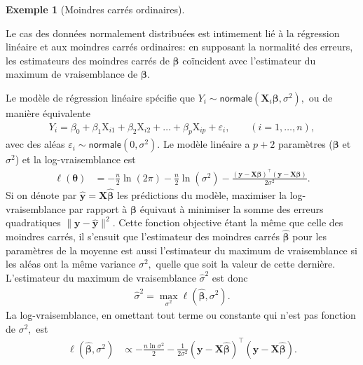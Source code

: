 \documentclass[
  11pt,
  letterpaper,
]{scrbook}
\theoremstyle{plain}
\theoremstyle{plain}
\theoremstyle{definition}
\newtheorem{example}{Exemple}[chapter]
\theoremstyle{definition}
\theoremstyle{remark}
\begin{document}
\begin{example}[Moindres carrés
ordinaires]\protect\hypertarget{exm-mco-mle}{}\label{exm-mco-mle}

Le cas des données normalement distribuées est intimement lié à la
régression linéaire et aux moindres carrés ordinaires: en supposant la
normalité des erreurs, les estimateurs des moindres carrés de
\(\boldsymbol{\beta}\) coïncident avec l'estimateur du maximum de
vraisemblance de \(\boldsymbol{\beta}.\)

Le modèle de régression linéaire spécifie que
\(Y_i \sim \mathsf{normale}(\mathbf{X}_i\boldsymbol{\beta}, \sigma^2),\)
ou de manière équivalente \begin{align*}
Y_i=\beta_0+\beta_1 \mathrm{X}_{i1}+\beta_2 \mathrm{X}_{i2}+\ldots +\beta_p \mathrm{X}_{ip} + \varepsilon_i, \qquad  (i=1, \ldots, n),
\end{align*} avec des aléas
\(\varepsilon_i \sim \mathsf{normale}(0, \sigma^2).\) Le modèle linéaire
a \(p+2\) paramètres (\(\boldsymbol{\beta}\) et \(\sigma^2\)) et la
log-vraisemblance est \begin{align*}
\ell(\boldsymbol{\theta})&=-\frac{n}{2} \ln(2\pi)-\frac{n}{2} \ln (\sigma^2) -\frac{(\boldsymbol{y}-\mathbf{X}\boldsymbol{\beta})^\top(\boldsymbol{y}-\mathbf{X}\boldsymbol{\beta})}{2\sigma^2}.
\end{align*} Si on dénote par
\(\widehat{\boldsymbol{y}}=\mathbf{X}\widehat{\boldsymbol{\beta}}\) les
prédictions du modèle, maximiser la log-vraisemblance par rapport à
\(\boldsymbol{\beta}\) équivaut à minimiser la somme des erreurs
quadratiques \(\|\boldsymbol{y} - \widehat{\boldsymbol{y}}\|^2.\) Cette
fonction objective étant la même que celle des moindres carrés, il
s'ensuit que l'estimateur des moindres carrés
\(\widehat{\boldsymbol{\beta}}\) pour les paramètres de la moyenne est
aussi l'estimateur du maximum de vraisemblance si les aléas ont la même
variance \(\sigma^2,\) quelle que soit la valeur de cette dernière.
L'estimateur du maximum de vraisemblance \(\widehat{\sigma}^2\) est donc
\begin{align*}
\widehat{\sigma}^2=\max_{\sigma^2} \ell(\widehat{\boldsymbol{\beta}}, \sigma^2).
\end{align*} La log-vraisemblance, en omettant tout terme ou constante
qui n'est pas fonction de \(\sigma^2,\) est \begin{align*}
\ell(\widehat{\boldsymbol{\beta}}, \sigma^2)
&\propto-\frac{n\ln\sigma^2}{2}-\frac{1}{2\sigma^2}(\boldsymbol{y}-\mathbf{X}\hat{\boldsymbol{\beta}})^\top(\boldsymbol{y}-\mathbf{X}\hat{\boldsymbol{\beta}}).

\end{align*}
\end{example}
\end{document}
